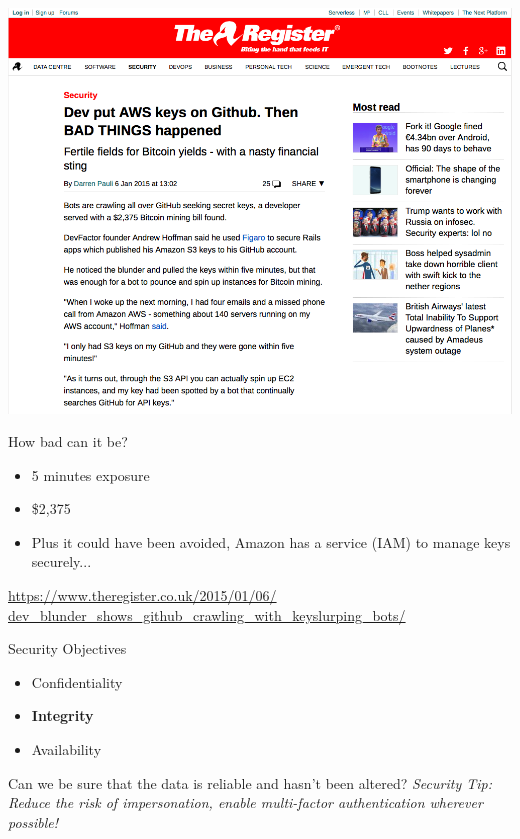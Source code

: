 \documentclass{beamer}
\begin{document}
\begin{frame}{}
\begin{center}
\includegraphics[width=0.8\linewidth]{github-bitcoin.png}
\end{center}
\end{frame}

\begin{frame}{How bad can it be?}
\begin{itemize}
\item 5 minutes exposure
\item \$2,375
\item Plus it could have been avoided, Amazon has a service (IAM) to manage keys securely...
\end{itemize}
{\small \url{https://www.theregister.co.uk/2015/01/06/ dev_blunder_shows_github_crawling_with_keyslurping_bots/} \par}
\end{frame}

\begin{frame}{Security Objectives}
	\begin{itemize}
		\item Confidentiality
		\item \textbf{Integrity}
        \item Availability
	\end{itemize}
    Can we be sure that the data is reliable and hasn't been altered?
	\linebreak
    \linebreak
    { \color{red} \textit{Security Tip: Reduce the risk of impersonation, enable multi-factor authentication wherever possible!} }
\end{frame}
\end{document}
